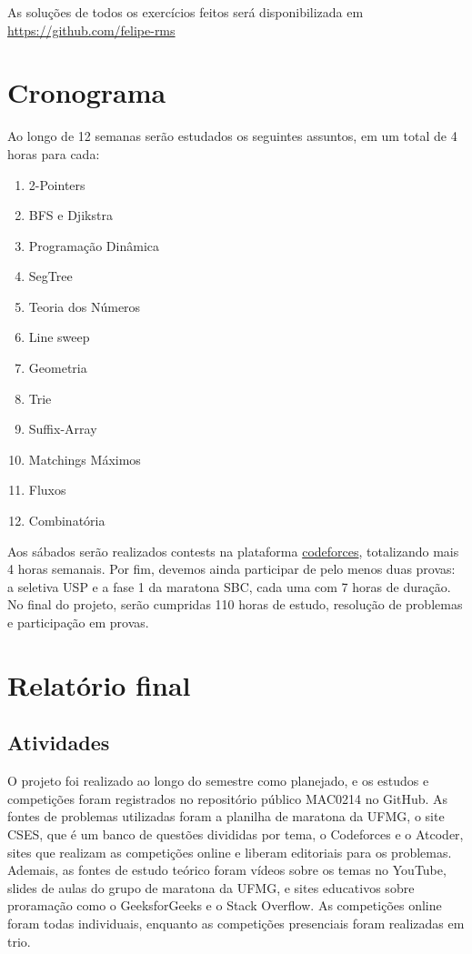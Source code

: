 \documentclass{article}
\begin{document}
\hspace{5mm} As soluções de todos os exercícios feitos será disponibilizada em \href{https://github.com/felipe-rms}{https://github.com/felipe-rms}
\section{Cronograma}
\hspace{1cm}Ao longo de 12 semanas serão estudados os seguintes assuntos, em um total de 4 horas para cada:
\begin{enumerate}
    \item 2-Pointers
    \item BFS e Djikstra
    \item Programação Dinâmica
    \item SegTree
    \item Teoria dos Números
    \item Line sweep
    \item Geometria
    \item Trie
    \item Suffix-Array
    \item Matchings Máximos
    \item Fluxos
    \item Combinatória
\end{enumerate}

\hspace{5mm}Aos sábados serão realizados contests na plataforma \href{https://codeforces.com}{codeforces}, totalizando mais 4 horas semanais. Por fim, devemos ainda participar de pelo menos duas provas: a seletiva USP e a fase 1 da maratona SBC, cada uma com 7 horas de duração. No final do projeto, serão cumpridas 110 horas de estudo, resolução de problemas e participação em provas. 

\section{Relatório final}
\subsection{Atividades}
\hspace{1cm} O projeto foi realizado ao longo do semestre como planejado, e os estudos e competições foram registrados no repositório público MAC0214 no GitHub. As fontes de problemas utilizadas foram a planilha de maratona da UFMG, o site CSES, que é um banco de questões divididas por tema, o Codeforces e o Atcoder, sites que realizam as competições online e liberam editoriais para os problemas. Ademais, as fontes de estudo teórico foram vídeos sobre os temas no YouTube, slides de aulas do grupo de maratona da UFMG, e sites educativos sobre proramação como o GeeksforGeeks e o Stack Overflow. As competições online foram todas individuais, enquanto as competições presenciais foram realizadas em trio.
\end{document}
